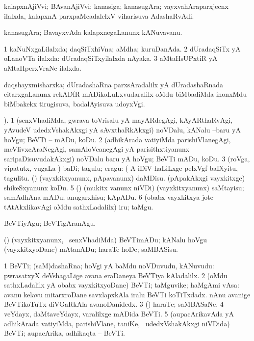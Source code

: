 \bentry 
{} 
\gl{\nA}
\bmng
 kalapxnAjiVvi; BAvanAjiVvi; kanasiga; kanasugAra; vayxvahAraparxjecnx ilalxda, kalapxnA parxpaMcadalelxV viharisuva AdashaRvAdi. 
\emng
\eentry

\bentry 
{} 
\gl{\nA}
\expl{}
\bmng
 kanasugAra; BavayxvAda kalapxnegaLanunx kANuvavanu. 
\emng
\eentry

\bentry 
{} 
\gl{\gu}
\expl{}
\bmng
\bnum
\num{1} kaNuNxgaLilalxda; daqSiTxhiVna; aMdha; kuruDanAda. 
\num{2} dUradaqSiTx yA oLanoVTa ilalxda:  dUradaqSiTxyilalxda nAyaka. 
\num{3} aMtaHsUPxtiR yA aMtaHperxVraNe ilalxda. 
\enum
\emng
\eentry

\bentry
{} 
\gl{\nA}
\expl{}
\bmng
 daqshayxmisharxka; dUradashaRna parxsAradalilx yA dUradashaRnada citarxgaLanunx rekADfR mADikoLuLxvudaralilx oMdu biMbadiMda inonxMdu biMbakekx tirugisuva, badalAyisuva udoyxVgi. 
\emng
\eentry

\bentry
{} 
\gl{\sakirx}
). \bmng
\bnum
\num{1} (senxVhadiMda, gwrava toVrisalu yA mayARdegAgi, kAyARthaRvAgi, yAvudeV udedxVshakAkxgi yA sAvxthaRkAkxgi) noVDalu, kANalu --baru yA hoVgu; BeVTi -- mADu, koDu. 
\num{2} (adhikArada vatiyiMda parishiVlanegAgi, meVlivxcAraNegAgi, samAloVcanegAgi yA parisithxtiyanunx saripaDisuvudakAkxgi) noVDalu baru yA hoVgu; BeVTi mADu, koDu. 
\num{3} (roVga, vipatutx, \mo vugaLa \vi) baDi; tagulu; eragu:  (  A iDiV haLiLxge pelxVgf baDiyitu, tagulitu. 
 (\beY) 
\banum
{} (vayxkitxyanunx, pApavanunx) daMDisu. 
 (pApakAkxgi vayxkitxge) shikeSxyanunx koDu. 
\eanum
\numie
\num{5} (\pArxparx) (mukitx \mo vanunx niVDi) (vayxkitxyanunx) saMtayisu; samAdhAna mADu; anugarxhisu; kApADu. 
\num{6} (obabx vayxkitxya jote tAtAkxlikavAgi oMdu sathxLadalilx) iru; taMgu. 
\enum
\emng

\noindent 
\gl{\akirx}
\expl{}
\bmng
BeVTiyAgu; BeVTigAranAgu. 
\emng

\noindent 
\gl{\pagu}
\expl{}
\bmng
\banum
{} (\ame) (vayxkitxyanunx, \kanmu\ senxVhadiMda) BeVTimADu; kANalu hoVgu 
 (vayxkitxyoDane) mAtanADu; haraTe hoDe; saMBASisu. 
\eanum
\emng
\eentry

\bentry
{} 
\gl{\nA}
\expl{}
\bmng
\bnum
\num{1} BeVTi; (saM)dashaRna; hoVgi yA baMdu noVDuvudu, kANuvudu:  pwrasatxyX deVshagaLige avana eraDaneya BeVTiya kAladalilx. 
\num{2} (oMdu sathxLadalilx yA obabx vayxkitxyoDane) BeVTi; taMguvike; haMgAmi vAsa:  avanu kelavu mitarxroDane savxlapxkAla iralu BeVTi koTiTxdadx.  nAnu avanige BeVTikoTuTx diVGaRkAla avanoDanidedx. 
\num{3} (\ame) haraTe; saMBASaNe. 
\num{4} veYdayx, daMtaveYdayx, \mo varalilxge mADida BeVTi. 
\num{5} (aupacArikavAda yA adhikArada vatiyiMda, parishiVlane, taniKe, \mo\ udedxVshakAkxgi niVDida) BeVTi; aupacArika, adhikaqta -- BeVTi. 
\enum
\emng

